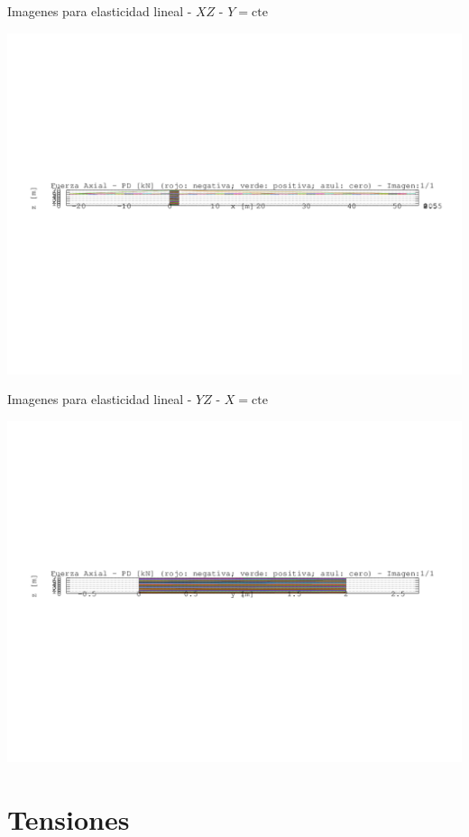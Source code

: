 \documentclass[a4paper,11pt]{article}
\begin{document}
\begin{center}       
Imagenes para elasticidad lineal -  $XZ$ - $Y=\text{cte}$ 

\includegraphics[width=.80\textwidth]{../../XY_XZ_YZ/XZ/fuerza_axial/grua_fuerza_axial_XZ_1.png}      

\end{center}       
\newpage       
\begin{center}       
Imagenes para elasticidad lineal -  $YZ$ - $X=\text{cte}$ 

\includegraphics[width=.80\textwidth]{../../XY_XZ_YZ/YZ/fuerza_axial/grua_fuerza_axial_YZ_1.png}      

\end{center}       
\newpage       

\section{Tensiones}
\end{document}

